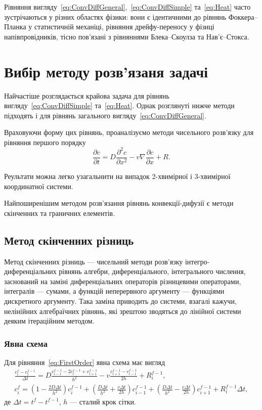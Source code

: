 \documentclass{diploma}
\begin{document}
Рівняння вигляду~\ref{eq:ConvDiffGeneral},~\ref{eq:ConvDiffSimple} та~\ref{eq:Heat} часто зустрічаються у різних областях фізики: вони є ідентичними до рівнянь Фоккера--Планка у статистичній механіці, рівняння дрейфу-переносу у фізиці напівпровідників, тісно пов'язані з рівняннями Блека--Скоулза та Нав'є--Стокса.

\section{Вибір методу розв'язаня задачі}
Найчастіше розглядається крайова задача для рівнянь вигляду~\ref{eq:ConvDiffSimple} та~\ref{eq:Heat}. Однак розглянуті нижче методи підходять і для рівнянь загального вигляду~\ref{eq:ConvDiffGeneral}.

Враховуючи форму цих рівнянь, проаналізуємо методи чисельного розв'язку для рівняння першого порядку
\begin{equation} \label{eq:FirstOrder}
	\frac{\partial c}{\partial t} = D \frac{\partial^2 c}{\partial x^2} - v\nabla \frac{\partial c}{\partial x} + R.
\end{equation}

Реультати можна легко узагальнити на випадок 2-хвимірної і 3-хвимірної координатної системи.

Найпоширенішим методом розв'язання рівнянь конвекції-дифузії є методи скінченних та граничних елементів.

\subsection{Метод скінченних різниць}
Метод скінченних різниць --- чисельний методи розв'язку інтегро-диференціальних рівнянь алгебри, диференціального, інтегрального числення, заснований на заміні диференціальних операторів різницевими операторами, інтегралів --- сумами, а функцій неперервного аргументу --- функціями дискретного аргументу. Така заміна приводить до системи, взагалі кажучи, нелінійних алгебраїчних рівнянь, які зрештою зводяться до лінійної системи деяким ітераційним методом.

\subsubsection{Явна схема}
Для рівняння~\ref{eq:FirstOrder} явна схема має вигляд
\begin{equation} \label{eq:ExplicitScheme}
	\begin{array}{l}
	\frac{c_i ^f - c_i ^{f-1}}{\Delta t} = D \frac{c_{i-1} ^{f-1} - 2c_i ^{f-1} + c_{i+1} ^{f-1}}{h^2} - v \frac{c_{i+1} ^{f-1} - c_{i-1} ^{f-1}}{2h} + R_i ^{f-1}, \\
	c_i ^f = \left(1-\frac{2D\Delta t}{h^2}\right) c_i ^{f-1} + \left(\frac{D \Delta t}{h^2} + \frac{v \Delta t}{2h}\right) c_{i-1} ^{f-1} + \left(\frac{D \Delta t}{h^2} - \frac{v \Delta t}{2h}\right) c_{i+1} ^{f-1} + R_i ^{f-1} \Delta t,
	\end{array}
\end{equation}
де $\Delta t = t^{f} - t^{f-1}$, $h$ --- сталий крок сітки.
\end{document}
